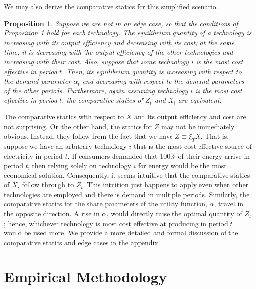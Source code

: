 \documentclass[11pt,a4paper,leqno]{extarticle}
\newtheorem{proposition}{Proposition}
\begin{document}
	We may also derive the comparative statics for this simplified scenario.  
	\begin{proposition}
		Suppose we are not in an edge case, so that the conditions of Proposition 1 hold for each technology. The equilibrium quantity of a technology is increasing with its output efficiency and decreasing with its cost; at the same time, it is decreasing with the output efficiency of the other technologies and increasing with their cost. Also, suppose that some technology $i$ is the most cost effective in period $t$. Then, its equilibrium quantity is increasing with respect to the demand parameter $\alpha_t$ and decreasing with respect to the demand parameters of the other periods. Furthermore, again assuming technology $i$ is the most cost effective in period $t$, the comparative statics of $Z_t$ and $X_i$ are equivalent. 
	\end{proposition}	
	The comparative statics with respect to $X$ and its output efficiency and cost are not surprising. On the other hand, the statics for $Z$ may not be immediately obvious. Instead, they follow from the fact that we have $Z \equiv \xi_T X$. That is, suppose we have an arbitrary technology $i$ that is the most cost effective source of electricity in period $t$. If consumers demanded that 100\% of their energy arrive in period $t$, then relying solely on technology $i$ for energy would be the most economical solution. Consequently, it seems intuitive that the comparative statics of $X_i$ follow through to $Z_t$. This intuition just happens to apply even when other technologies are employed and there is demand in multiple periods. Similarly, the comparative statics for the share parameters of the utility function, $\alpha$, travel in the opposite direction. A rise in $\alpha_t$ would directly raise the optimal quantity of $Z_t$; hence, whichever technology is most cost effective at producing in period $t$ would be used more. We provide a more detailed and formal discussion of the comparative statics and edge cases in the appendix. 
	
	
	
	
	
	\section{Empirical Methodology}
	\label{sec:methodology}
	
\end{document}
